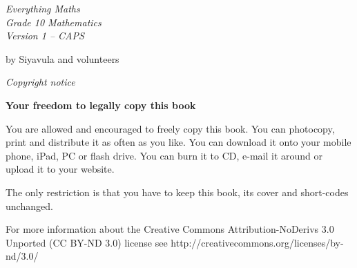 

\begin{titlepage}
\begin{adjustwidth}{1in}{1in}
\begin{center}
    \thispagestyle{empty}

    \vspace*{4in}

    {\normalfont\sffamily\fontsize{36}\normalfont\itshape{Everything Maths } \\ \vspace*{1cm}
    {\normalfont\sffamily\fontsize{22}\normalfont\itshape{Grade 10 Mathematics}}
    \vspace*{1in} \\
    \LARGE Version 1 -- CAPS \\

   {\vspace*{2in}
     by Siyavula and volunteers 
  

\vfill

    }}
\end{center}
\end{adjustwidth}
\end{titlepage}






\newpage
\thispagestyle{empty}
{
\begin{center}
\normalfont\sffamily\fontsize{22}\normalfont\itshape Copyright notice\\

\vspace*{1in}

\textbf{Your freedom to legally copy this book}\\

\end{center}
}

{\LARGE
You are allowed and encouraged to freely copy this book. You can photocopy, print and distribute it as
often as you like. You can download it onto your mobile phone, iPad, PC or flash drive. You can burn it
to CD, e-mail it around or upload it to your website. \par

The only restriction is that you have to keep this book, its cover and short-codes unchanged.\par

For more information about the Creative Commons Attribution-NoDerivs 3.0 Unported (CC BY-ND
3.0) license see http://creativecommons.org/licenses/by-nd/3.0/}\\

